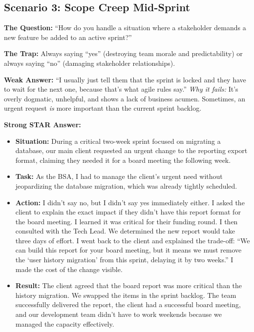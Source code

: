\subsection{Scenario 3: Scope Creep
Mid-Sprint}\label{scenario-3-scope-creep-mid-sprint}

\textbf{The Question:} ``How do you handle a situation where a
stakeholder demands a new feature be added to an active sprint?''

\textbf{The Trap:} Always saying ``yes'' (destroying team morale and
predictability) or always saying ``no'' (damaging stakeholder
relationships).

\textbf{Weak Answer:} ``I usually just tell them that the sprint is
locked and they have to wait for the next one, because that's what agile
rules say.'' \emph{Why it fails:} It's overly dogmatic, unhelpful, and
shows a lack of business acumen. Sometimes, an urgent request \emph{is}
more important than the current sprint backlog.

\textbf{Strong STAR Answer:}

\begin{itemize}
\tightlist
\item
  \textbf{Situation:} During a critical two-week sprint focused on
  migrating a database, our main client requested an urgent change to
  the reporting export format, claiming they needed it for a board
  meeting the following week.
\item
  \textbf{Task:} As the BSA, I had to manage the client's urgent need
  without jeopardizing the database migration, which was already tightly
  scheduled.
\item
  \textbf{Action:} I didn't say no, but I didn't say yes immediately
  either. I asked the client to explain the exact impact if they didn't
  have this report format for the board meeting. I learned it was
  critical for their funding round. I then consulted with the Tech Lead.
  We determined the new report would take three days of effort. I went
  back to the client and explained the trade-off: ``We can build this
  report for your board meeting, but it means we must remove the `user
  history migration' from this sprint, delaying it by two weeks.'' I
  made the cost of the change visible.
\item
  \textbf{Result:} The client agreed that the board report was more
  critical than the history migration. We swapped the items in the
  sprint backlog. The team successfully delivered the report, the client
  had a successful board meeting, and our development team didn't have
  to work weekends because we managed the capacity effectively.
\end{itemize}


